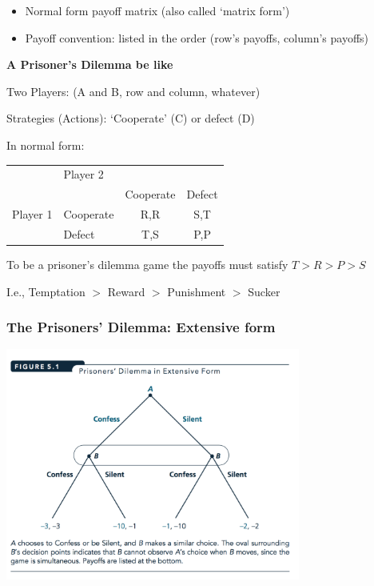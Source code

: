 \documentclass[]{article}
\begin{document}
\begin{itemize}
\item
  Normal form payoff matrix (also called `matrix form')
\item
  Payoff convention: listed in the order (row's payoffs, column's
  payoffs)
\end{itemize}

\bigskip

\textbf{A Prisoner's Dilemma be like}

Two Players: (A and B, row and column, whatever)

Strategies (Actions): `Cooperate' (C) or defect (D)

In normal form:

\begin{center}
\begin{tabular}{llcc}
                              & \multicolumn{3}{l}{Player 2}                                                                  \\ \cline{2-4}
\multicolumn{1}{l|}{}         & \multicolumn{1}{l|}{}          & \multicolumn{1}{l|}{Cooperate} & \multicolumn{1}{l|}{Defect} \\ \cline{2-4}
\multicolumn{1}{l|}{Player 1} & \multicolumn{1}{l|}{Cooperate} & \multicolumn{1}{c|}{R,R}       & \multicolumn{1}{c|}{S,T}    \\ \cline{2-4}
\multicolumn{1}{l|}{}         & \multicolumn{1}{l|}{Defect}    & \multicolumn{1}{c|}{T,S}       & \multicolumn{1}{c|}{P,P}    \\ \cline{2-4}
\end{tabular}
\end{center}

To be a prisoner's dilemma game the payoffs must satisfy
\(T > R > P > S\)

I.e., Temptation \(>\) Reward \(>\) Punishment \(>\) Sucker

\hypertarget{the-prisoners-dilemma-extensive-form}{%
\subsubsection{The Prisoners' Dilemma: Extensive
form}\label{the-prisoners-dilemma-extensive-form}}

\includegraphics[height=3in]{picsfigs/pd_extensive.png}
\end{document}
